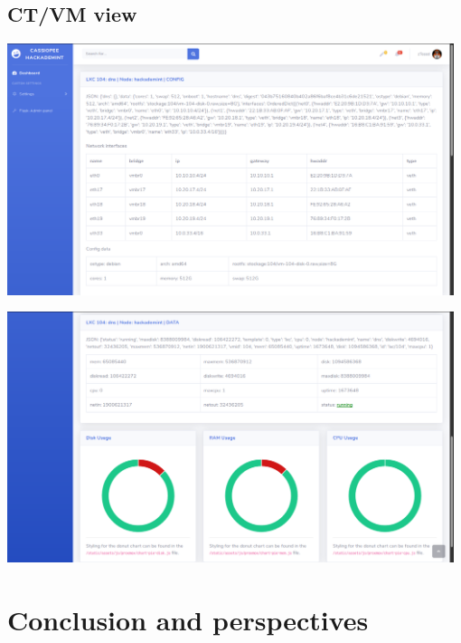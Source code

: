 \subsection{CT/VM view}
\vspace{1cm}
\begin{center}
\includegraphics[width=0.98\textwidth]{images/flask-application-2.png}
\end{center}
\vspace{1cm}
\begin{center}
\includegraphics[width=0.98\textwidth]{images/flask-application-3.png}
\end{center}

\pagebreak

\section{Conclusion and perspectives}


